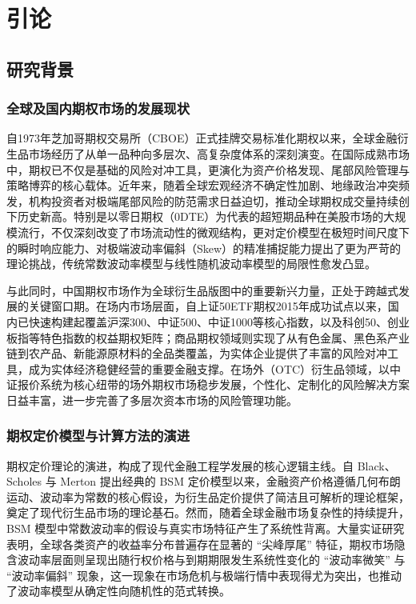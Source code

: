 \chapter{引论}
\section{研究背景}
\subsection{全球及国内期权市场的发展现状}

自1973年芝加哥期权交易所（CBOE）正式挂牌交易标准化期权以来，全球金融衍生品市场经历了从单一品种向多层次、高复杂度体系的深刻演变。在国际成熟市场中，期权已不仅是基础的风险对冲工具，更演化为资产价格发现、尾部风险管理与策略博弈的核心载体。近年来，随着全球宏观经济不确定性加剧、地缘政治冲突频发，机构投资者对极端尾部风险的防范需求日益迫切，推动全球期权成交量持续创下历史新高。特别是以零日期权（0DTE）为代表的超短期品种在美股市场的大规模流行，不仅深刻改变了市场流动性的微观结构，更对定价模型在极短时间尺度下的瞬时响应能力、对极端波动率偏斜（Skew）的精准捕捉能力提出了更为严苛的理论挑战，传统常数波动率模型与线性随机波动率模型的局限性愈发凸显。

与此同时，中国期权市场作为全球衍生品版图中的重要新兴力量，正处于跨越式发展的关键窗口期。在场内市场层面，自上证50ETF期权2015年成功试点以来，国内已快速构建起覆盖沪深300、中证500、中证1000等核心指数，以及科创50、创业板指等特色指数的权益期权矩阵；商品期权领域则实现了从有色金属、黑色系产业链到农产品、新能源原材料的全品类覆盖，为实体企业提供了丰富的风险对冲工具，成为实体经济稳健经营的重要金融支撑。在场外（OTC）衍生品领域，以中证报价系统为核心纽带的场外期权市场稳步发展，个性化、定制化的风险解决方案日益丰富，进一步完善了多层次资本市场的风险管理功能。

\subsection{期权定价模型与计算方法的演进}

期权定价理论的演进，构成了现代金融工程学发展的核心逻辑主线。自 Black、Scholes 与 Merton 提出经典的 BSM 定价模型以来，金融资产价格遵循几何布朗运动、波动率为常数的核心假设，为衍生品定价提供了简洁且可解析的理论框架，奠定了现代衍生品市场的理论基石。然而，随着全球金融市场复杂性的持续提升，BSM 模型中常数波动率的假设与真实市场特征产生了系统性背离。大量实证研究表明，全球各类资产的收益率分布普遍存在显著的 “尖峰厚尾” 特征，期权市场隐含波动率层面则呈现出随行权价格与到期期限发生系统性变化的 “波动率微笑” 与 “波动率偏斜” 现象，这一现象在市场危机与极端行情中表现得尤为突出，也推动了波动率模型从确定性向随机性的范式转换。

